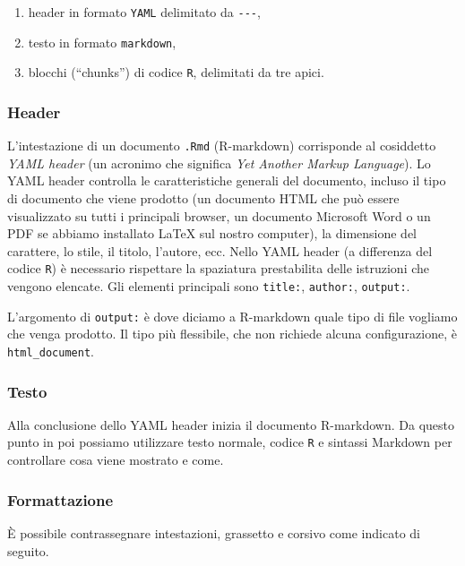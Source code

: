 \documentclass[
  11pt,
]{krantz}
\providecommand{\tightlist}{%
  \setlength{\itemsep}{0pt}\setlength{\parskip}{0pt}}
\theoremstyle{definition}
\theoremstyle{definition}
\theoremstyle{definition}
\theoremstyle{definition}
\theoremstyle{remark}
\begin{document}
\begin{enumerate}
\def\labelenumi{\arabic{enumi}.}
\tightlist
\item
  header in formato \texttt{YAML} delimitato da \texttt{-\/-\/-},
\item
  testo in formato \texttt{markdown},
\item
  blocchi (``chunks'') di codice \texttt{R}, delimitati da tre apici.
\end{enumerate}

\hypertarget{header}{%
\subsubsection{Header}\label{header}}

L'intestazione di un documento \texttt{.Rmd} (R-markdown) corrisponde al cosiddetto \emph{YAML header} (un acronimo che significa \emph{Yet Another Markup Language}). Lo YAML header controlla le caratteristiche generali del documento, incluso il tipo di documento che viene prodotto (un documento HTML che può essere visualizzato su tutti i principali browser, un documento Microsoft Word o un PDF se abbiamo installato LaTeX sul nostro computer), la dimensione del carattere, lo stile, il titolo, l'autore, ecc. Nello YAML header (a differenza del codice \texttt{R}) è necessario rispettare la spaziatura prestabilita delle istruzioni che vengono elencate. Gli elementi principali sono \texttt{title:}, \texttt{author:}, \texttt{output:}.

L'argomento di \texttt{output:} è dove diciamo a R-markdown quale tipo di file vogliamo che venga prodotto. Il tipo più flessibile, che non richiede alcuna configurazione, è \texttt{html\_document}.

\hypertarget{testo}{%
\subsubsection{Testo}\label{testo}}

Alla conclusione dello YAML header inizia il documento R-markdown. Da questo punto in poi possiamo utilizzare testo normale, codice \texttt{R} e sintassi Markdown per controllare cosa viene mostrato e come.

\hypertarget{formattazione}{%
\subsubsection{Formattazione}\label{formattazione}}

È possibile contrassegnare intestazioni, grassetto e corsivo come indicato di seguito.
\end{document}
